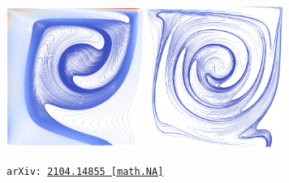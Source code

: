 \documentclass[presentation,aspectratio=43, 10pt]{beamer}
\newcommand{\arxivlink}[2]{{\texttt{arXiv:\,\href{https://arxiv.org/abs/#1}{#1\,[#2]}}}}
\begin{document}
\begin{frame}
\begin{columns}
\begin{column}{0.45\textwidth}
      \includegraphics[width=0.333\textwidth]{mhd/ldc_500_500_B}%
      \includegraphics[width=0.333\textwidth]{mhd/ldc_5000_5000_B}%

      \vspace{2em}
      {\raggedleft\scriptsize
        \textcite{Laakmann:2021} \arxivlink{2104.14855}{math.NA}\par}
    \end{column}
  \end{columns}
\end{frame}
\end{document}
